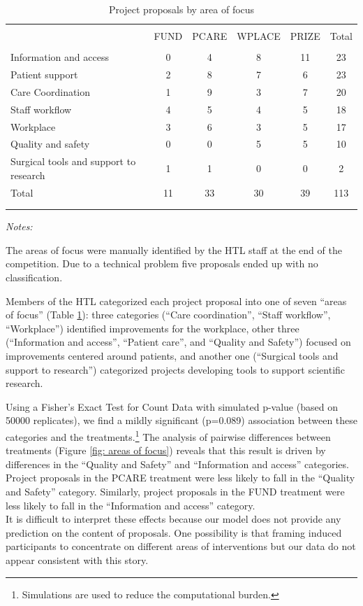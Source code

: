 \documentclass[12pt, titlepage]{article}
\newenvironment{tablenotes}[1][]{
  \begin{minipage}{\textwidth}\emph{Notes:}{\footnotesize #1}
}{\end{minipage}}
\begin{document}
\begin{table}
\centering
\caption{Project proposals by area of focus}
\label{tab: area-of-focus}
\begin{tabular}{@{}lccccc}
  \\[-1.8ex]\hline \hline \\[-1.8ex]
 & FUND & PCARE & WPLACE & PRIZE & Total \\ 
  \hline \\[-1.86ex]
Information and access & 0 & 4 & 8 & 11 & 23 \\ 
  Patient support & 2 & 8 & 7 & 6 & 23 \\ 
  Care Coordination & 1 & 9 & 3 & 7 & 20 \\ 
  Staff workflow & 4 & 5 & 4 & 5 & 18 \\ 
  Workplace & 3 & 6 & 3 & 5 & 17 \\ 
  Quality and safety  & 0 & 0 & 5 & 5 & 10 \\ 
  Surgical tools and support to research & 1 & 1 & 0 & 0 & 2 \\ 
  [1.8ex] Total & 11 & 33 & 30 & 39 & 113 \\ 
   \\[-1.8ex]\hline \hline \\[-1.8ex]
\end{tabular}
\begin{tablenotes}
The areas of focus were manually identified by the HTL staff at the end of the competition. Due to a technical problem five proposals ended up with no classification.
\end{tablenotes}
\end{table}

Members of the HTL categorized each project proposal into one of seven
``areas of focus'' (Table \ref{tab: area-of-focus}): three categories
(``Care coordination'', ``Staff workflow'', ``Workplace'') identified
improvements for the workplace, other three (``Information and access'',
``Patient care'', and ``Quality and Safety'') focused on improvements
centered around patients, and another one (``Surgical tools and support
to research'') categorized projects developing tools to support
scientific research.

Using a Fisher's Exact Test for Count Data with simulated p-value (based
on 50000 replicates), we find a mildly significant (p=0.089) association
between these categories and the treatments.\footnote{Simulations are
  used to reduce the computational burden.} The analysis of pairwise
differences between treatments (Figure \ref{fig: areas of focus})
reveals that this result is driven by differences in the ``Quality and
Safety'' and ``Information and access'' categories. Project proposals in
the PCARE treatment were less likely to fall in the ``Quality and
Safety'' category. Similarly, project proposals in the FUND treatment
were less likely to fall in the ``Information and access'' category.\\
It is difficult to interpret these effects because our model does not
provide any prediction on the content of proposals. One possibility is
that framing induced participants to concentrate on different areas of
interventions but our data do not appear consistent with this story.
\end{document}
